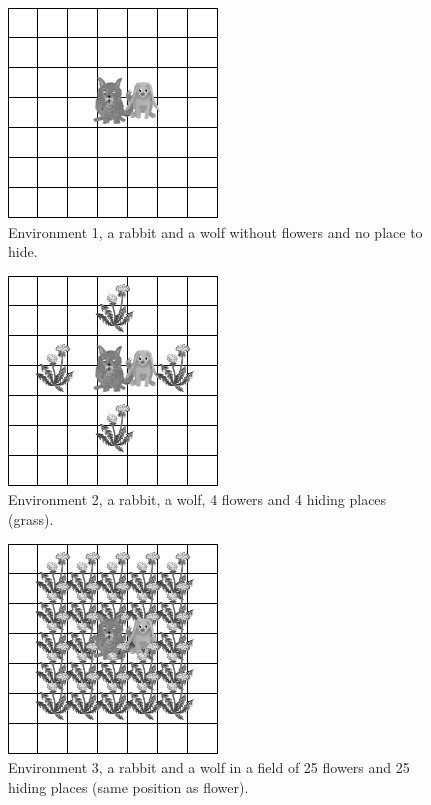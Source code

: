 \documentclass{aamas2012}
\begin{document}
	\begin{figure}
		\centering
		\includegraphics[keepaspectratio=true, scale=0.5]{environment_1.png}
		\caption
		{
			\label{environment_1}
			Environment 1, a rabbit and a wolf without flowers and no place to hide.
		}
	\end{figure}

	\begin{figure}
		\centering
		\includegraphics[keepaspectratio=true, scale=0.5]{environment_2.png}
		\caption
		{
			\label{environment_2}
			Environment 2, a rabbit, a wolf, 4 flowers and 4 hiding places (grass).
		}
	\end{figure}
	
	\begin{figure}
		\centering
		\includegraphics[keepaspectratio=true, scale=0.5]{environment_3.png}
		\caption
		{
			\label{environment_3}
			Environment 3, a rabbit and a wolf in a field of 25 flowers and 25 hiding places (same position as flower).
		}
	\end{figure}
	
\end{document}
